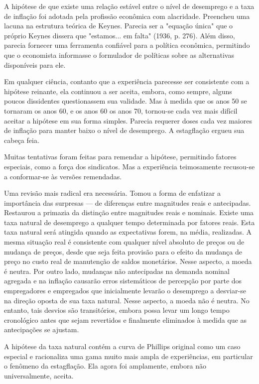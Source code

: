 \documentclass[12pt]{article}
\begin{document}
A hipótese de que existe uma relação estável entre o nível de desemprego e a taxa de inflação foi adotada pela profissão econômica com alacridade. Preencheu uma lacuna na estrutura teórica de Keynes. Parecia ser a "equação única" que o próprio Keynes dissera que "estamos... em falta" (1936, p. 276). Além disso, parecia fornecer uma ferramenta confiável para a política econômica, permitindo que o economista informasse o formulador de políticas sobre as alternativas disponíveis para ele.

Em qualquer ciência, contanto que a experiência parecesse ser consistente com a hipótese reinante, ela continuou a ser aceita, embora, como sempre, alguns poucos dissidentes questionassem sua validade. Mas à medida que os anos 50 se tornaram os anos 60, e os anos 60 os anos 70, tornou-se cada vez mais difícil aceitar a hipótese em sua forma simples. Parecia requerer doses cada vez maiores de inflação para manter baixo o nível de desemprego. A estagflação ergueu sua cabeça feia.

Muitas tentativas foram feitas para remendar a hipótese, permitindo fatores especiais, como a força dos sindicatos. Mas a experiência teimosamente recusou-se a conformar-se às versões remendadas.

Uma revisão mais radical era necessária. Tomou a forma de enfatizar a importância das surpresas — de diferenças entre magnitudes reais e antecipadas. Restaurou a primazia da distinção entre magnitudes reais e nominais. Existe uma taxa natural de desemprego a qualquer tempo determinada por fatores reais. Esta taxa natural será atingida quando as expectativas forem, na média, realizadas. A mesma situação real é consistente com qualquer nível absoluto de preços ou de mudança de preços, desde que seja feita provisão para o efeito da mudança de preço no custo real de manutenção de saldos monetários. Nesse aspecto, a moeda é neutra. Por outro lado, mudanças não antecipadas na demanda nominal agregada e na inflação causarão erros sistemáticos de percepção por parte dos empregadores e empregados que inicialmente levarão o desemprego a desviar-se na direção oposta de sua taxa natural. Nesse aspecto, a moeda não é neutra. No entanto, tais desvios são transitórios, embora possa levar um longo tempo cronológico antes que sejam revertidos e finalmente eliminados à medida que as antecipações se ajustam.

A hipótese da taxa natural contém a curva de Phillips original como um caso especial e racionaliza uma gama muito mais ampla de experiências, em particular o fenômeno da estagflação. Ela agora foi amplamente, embora não universalmente, aceita.
\end{document}
